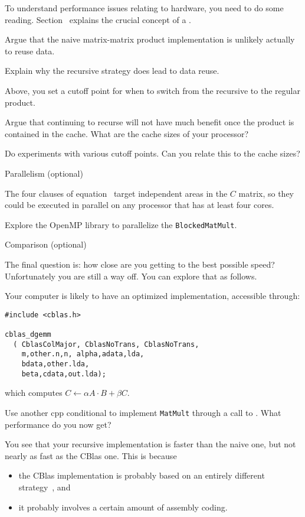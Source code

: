 To understand performance issues relating to hardware, you need to do some
reading. Section~ explains the crucial
concept of a .

\begin{exercise}
  Argue that the naive matrix-matrix
  product implementation is unlikely actually to reuse data.

  Explain why the recursive strategy does lead to data reuse.
\end{exercise}

Above, you set a cutoff point for when to switch from the recursive to
the regular product.

\begin{exercise}
  Argue that continuing to recurse will not have much benefit once the
  product is contained in the cache. What are the cache sizes of your
  processor?

  Do experiments with various cutoff points. Can you relate this to
  the cache sizes?
\end{exercise}

 {Parallelism (optional)}

The four clauses of equation~ target independent
areas in the $C$ matrix, so they could be executed in parallel on any
processor that has at least four cores.

Explore the OpenMP library to parallelize the \lstinline{BlockedMatMult}.

 {Comparison (optional)}

The final question is: how close are you getting to the best possible
speed? Unfortunately you are still a way off. You can explore that as
follows.

Your computer is likely to have an optimized implementation,
accessible through:
\begin{lstlisting}
#include <cblas.h>

cblas_dgemm
  ( CblasColMajor, CblasNoTrans, CblasNoTrans,
    m,other.n,n, alpha,adata,lda,
    bdata,other.lda,
    beta,cdata,out.lda);
\end{lstlisting}
which computes $C\leftarrow \alpha A\cdot B+\beta C$.

\begin{exercise}
  Use another cpp conditional to implement \lstinline{MatMult} through
  a call to . What performance do you now get?
\end{exercise}

You see that your recursive implementation is faster than the naive
one, but not nearly as fast as the CBlas one. This is because
\begin{itemize}
\item the CBlas implementation is probably based on an entirely
  different strategy~\cite{GotoGeijn:2008:Anatomy}, and
\item it probably involves a certain amount of assembly coding.
\end{itemize}

